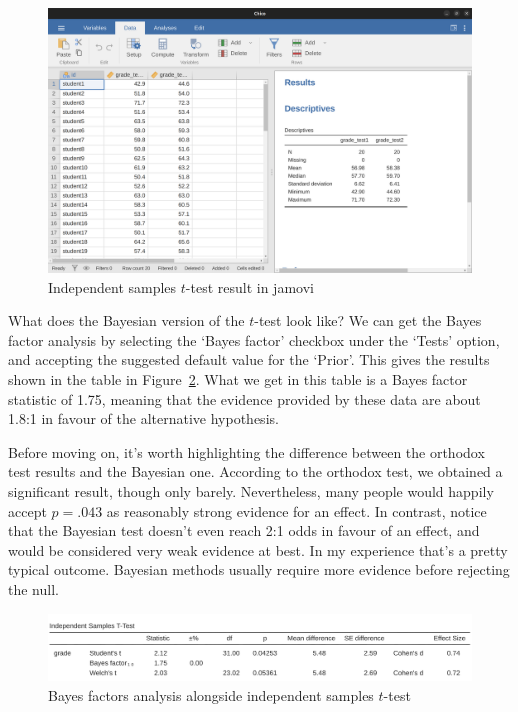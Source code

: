 \documentclass[
  a4paper,
]{book}
\begin{document}
\begin{figure}

\includegraphics[width=1\textwidth,height=\textheight]{images/fig11-12.png} \hfill{}

\caption{\label{fig-fig16-2}Independent samples \(t\)-test result in
jamovi}

\end{figure}

What does the Bayesian version of the \(t\)-test look like? We can get
the Bayes factor analysis by selecting the `Bayes factor' checkbox under
the `Tests' option, and accepting the suggested default value for the
`Prior'. This gives the results shown in the table in
Figure~\ref{fig-fig16-3}. What we get in this table is a Bayes factor
statistic of 1.75, meaning that the evidence provided by these data are
about 1.8:1 in favour of the alternative hypothesis.

Before moving on, it's worth highlighting the difference between the
orthodox test results and the Bayesian one. According to the orthodox
test, we obtained a significant result, though only barely.
Nevertheless, many people would happily accept \(p = .043\) as
reasonably strong evidence for an effect. In contrast, notice that the
Bayesian test doesn't even reach 2:1 odds in favour of an effect, and
would be considered very weak evidence at best. In my experience that's
a pretty typical outcome. Bayesian methods usually require more evidence
before rejecting the null.

\begin{figure}

\includegraphics[width=1\textwidth,height=\textheight]{images/fig16-3.png} \hfill{}

\caption{\label{fig-fig16-3}Bayes factors analysis alongside independent
samples \(t\)-test}

\end{figure}
\end{document}
